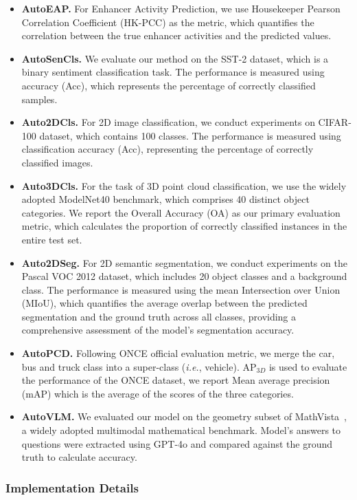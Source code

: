 \begin{itemize}
    \item \textbf{AutoEAP.} For Enhancer Activity Prediction, we use Housekeeper Pearson Correlation Coefficient (HK-PCC) as the metric, which quantifies the correlation between the true enhancer activities and the predicted values.
    \item \textbf{AutoSenCls.} We evaluate our method on the SST-2 dataset, which is a binary sentiment classification task. The performance is measured using accuracy (Acc), which represents the percentage of correctly classified samples.
    \item \textbf{Auto2DCls.} For 2D image classification, we conduct experiments on CIFAR-100 dataset, which contains 100 classes. The performance is measured using classification accuracy (Acc), representing the percentage of correctly classified images.
    \item \textbf{Auto3DCls.} For the task of 3D point cloud classification, we use the widely adopted ModelNet40 benchmark, which comprises 40 distinct object categories. We report the Overall Accuracy (OA) as our primary evaluation metric, which calculates the proportion of correctly classified instances in the entire test set.
    \item \textbf{Auto2DSeg.} For 2D semantic segmentation, we conduct experiments on the Pascal VOC 2012 dataset, which includes 20 object classes and a background class. The performance is measured using the mean Intersection over Union (MIoU), which quantifies the average overlap between the predicted segmentation and the ground truth across all classes, providing a comprehensive assessment of the model's segmentation accuracy.
    \item \textbf{AutoPCD.}  Following ONCE official evaluation metric, we merge the car, bus and truck class into a super-class (\textit{i.e.}, vehicle). $\text{AP}_{3D}$ is used to evaluate the performance of the ONCE dataset, we report Mean average precision (mAP) which is the average of the scores of the three categories.
    \item \textbf{AutoVLM.} We evaluated our model on the geometry subset of MathVista~\citep{lu2023mathvista}, a widely adopted multimodal mathematical benchmark. Model's answers to questions were extracted using GPT-4o and compared against the ground truth to calculate accuracy.
\end{itemize}

\subsubsection{Implementation Details}
\label{sec:implementation_detail}

